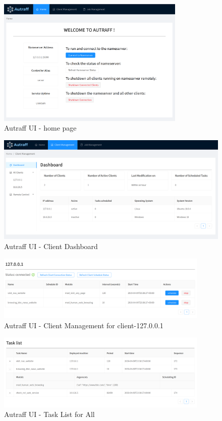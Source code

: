 \documentclass[12pt]{report}
\begin{document}
\begin{figure}[h!]
  \centering
  \includegraphics[width=0.8\textwidth]{./pictures/home-page}
  \caption{Autraff UI - home page}
\end{figure}

\begin{figure}[h!]
  \centering
  \includegraphics[width=1\textwidth]{./pictures/client-dash}
  \caption{Autraff UI - Client Dashboard}
\end{figure}

\begin{figure}[h!]
  \centering
  \includegraphics[width=0.9\textwidth]{./pictures/client-page}
  \caption{Autraff UI - Client Management for client-127.0.0.1}
\end{figure}

\begin{figure}[h!]
  \centering
  \includegraphics[width=0.9\textwidth]{./pictures/task-list}
  \caption{Autraff UI - Task List for All}
\end{figure}
\end{document}
